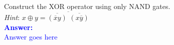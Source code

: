 \item{}
Construct the XOR operator using only NAND gates.\\[6pt]
\emph{Hint}\/: $x\oplus y=\overline{\overline{(\overline{x}y)}\,\,
\overline{(x\overline{y})}}$\\[12pt]
\ifanswers
\textcolor{blue}{
\textbf{Answer:}\\[12pt]
Answer goes here
}
\newpage
\fi

